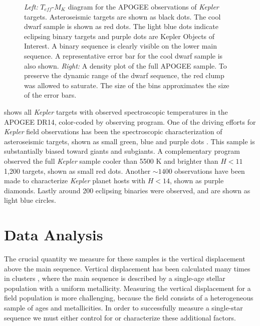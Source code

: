 \documentclass[manuscript]{aastex6}
\newcommand{\Kepler}{\mbox{\textit{Kepler}}}
\newcommand{\Teff}{\ensuremath{T_{eff}}}
\newcommand{\gvs}{\authorcomment1}
\begin{document}
\begin{figure}[htb]
    \centering
    \caption{\emph{Left:} \Teff-\(M_K\) diagram for the APOGEE observations of
        \Kepler{} targets. Asteroseismic targets are shown as black dots. The
        cool dwarf sample is shown as red dots. The light blue dots indicate 
        eclipsing binary targets and purple dots are Kepler Objects of 
        Interest. A binary sequence is clearly visible on the lower main
        sequence. A representative error bar for the cool dwarf sample is also
        shown. \emph{Right:} A density plot of the full APOGEE sample. To
        preserve the dynamic range of the dwarf sequence, the red clump was 
        allowed to saturate. The size of the bins approximates the size of the
    error bars.}\label{fig:apogee_selection}
\end{figure}

 shows all \Kepler{} targets with observed
spectroscopic temperatures in the APOGEE DR14, color-coded by observing
program. One of the driving efforts for \Kepler{} field observations has been
the spectroscopic characterization of asteroseismic targets, shown as small
green, blue and purple dots \citep{Zasowski17,Pinsonneault18}. This sample is 
substantially biased toward giants and subgiants. A complementary program 
observed the full \Kepler{} sample cooler than 5500 K and brighter than 
\(H < 11\) \gvs{Exact number} 1,200 targets, shown as small red dots. Another \(\sim 1400\) observations have been
made to characterize \Kepler{} planet hosts with \(H < 14\), shown as purple
diamonds. Lastly around 200 eclipsing binaries \citep{Prsa11,Slawson11} were
observed, and are shown as light blue circles.

\section{Data Analysis}
\label{sec:analysis}

The crucial quantity we measure for these samples is the vertical displacement
above the main sequence. Vertical displacement has been calculated many times
in clusters \citep{Mermilliod92}, where the main sequence is described by a
single-age stellar population with a uniform metallicity. Measuring the
vertical displacement for a field population is more challenging, because the
field consists of a heterogeneous sample of ages and metallicities. In order to
successfully measure a single-star sequence we must either control for or
characterize these additional factors. 
\end{document}
